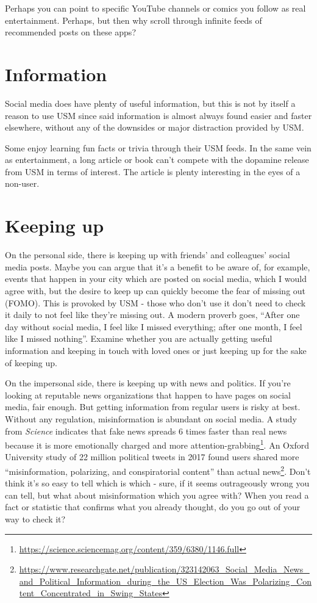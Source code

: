 \documentclass[
  openany]{book}
\begin{document}
Perhaps you can point to specific YouTube channels or comics you follow as real entertainment. Perhaps, but then why scroll through infinite feeds of recommended posts on these apps?

\section{Information}\label{information}

Social media does have plenty of useful information, but this is not by itself a reason to use USM since said information is almost always found easier and faster elsewhere, without any of the downsides or major distraction provided by USM.

Some enjoy learning fun facts or trivia through their USM feeds. In the same vein as entertainment, a long article or book can't compete with the dopamine release from USM in terms of interest. The article is plenty interesting in the eyes of a non-user.

\section{Keeping up}\label{keeping-up}

On the personal side, there is keeping up with friends' and colleagues' social media posts. Maybe you can argue that it's a benefit to be aware of, for example, events that happen in your city which are posted on social media, which I would agree with, but the desire to keep up can quickly become the fear of missing out (FOMO). This is provoked by USM - those who don't use it don't need to check it daily to not feel like they're missing out. A modern proverb goes, ``After one day without social media, I feel like I missed everything; after one month, I feel like I missed nothing''. Examine whether you are actually getting useful information and keeping in touch with loved ones or just keeping up for the sake of keeping up.

On the impersonal side, there is keeping up with news and politics. If you're looking at reputable news organizations that happen to have pages on social media, fair enough. But getting information from regular users is risky at best. Without any regulation, misinformation is abundant on social media. A study from \emph{Science} indicates that fake news spreads 6 times faster than real news because it is more emotionally charged and more attention-grabbing\footnote{\url{https://science.sciencemag.org/content/359/6380/1146.full}}. An Oxford University study of 22 million political tweets in 2017 found users shared more ``misinformation, polarizing, and conspiratorial content'' than actual news\footnote{\url{https://www.researchgate.net/publication/323142063_Social_Media_News_and_Political_Information_during_the_US_Election_Was_Polarizing_Content_Concentrated_in_Swing_States}}. Don't think it's so easy to tell which is which - sure, if it seems outrageously wrong you can tell, but what about misinformation which you agree with? When you read a fact or statistic that confirms what you already thought, do you go out of your way to check it?
\end{document}
